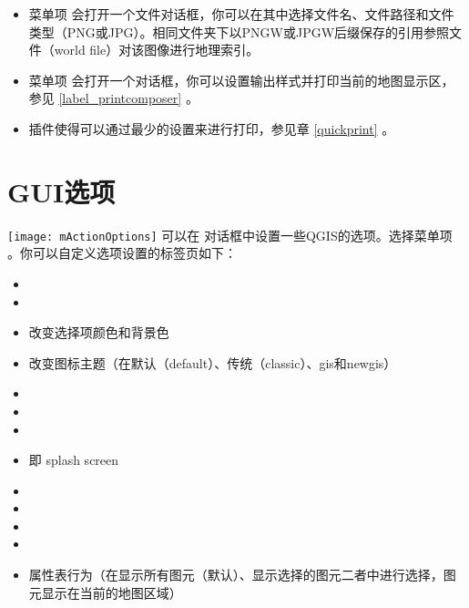 \begin{itemize}
\item 菜单项  会打开一个文件对话框，你可以在其中选择文件名、文件路径和文件类型（PNG或JPG）。相同文件夹下以PNGW或JPGW后缀保存的引用参照文件（world file）对该图像进行地理索引。
\item 菜单项  会打开一个对话框，你可以设置输出样式并打印当前的地图显示区，参见 \ref{label_printcomposer} 。
\item {} 插件使得可以通过最少的设置来进行打印，参见章 \ref{quickprint} 。
\end{itemize}

\section{GUI选项}\label{subsec:gui_options}

\texttt{[image: mActionOptions]} 可以在  对话框中设置一些QGIS的选项。选择菜单项  \arrow
{} 。你可以自定义选项设置的标签页如下：


\begin{itemize}
\item {}
\item {}
\item 改变选择项颜色和背景色
\item 改变图标主题（在默认（default）、传统（classic）、gis和newgis）
\item {}
\item {}
\item {}
\item {} 即 splash screen
\item {}
\item {}
\item {}
\item {}
\item 属性表行为（在显示所有图元（默认）、显示选择的图元二者中进行选择，图元显示在当前的地图区域）
\end{itemize}

